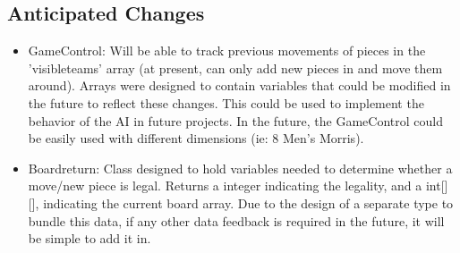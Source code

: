 \documentclass[12pt]{article}
\begin{document}
	\subsection{Anticipated Changes}
	\begin{itemize}
	\item    GameControl: Will be able to track previous movements of pieces in the 'visibleteams' array (at present, can only add new pieces in and move them around). Arrays were designed to contain variables that could be modified in the future to reflect these changes. This could be used to implement the behavior of the AI in future projects. 
	In the future, the GameControl could be easily used with different dimensions (ie: 8 Men's Morris).  
	\item    Boardreturn: Class designed to hold variables needed to determine whether a move/new piece is legal. Returns a integer indicating the legality, and a int[][], indicating the current board array. Due to the design of a separate type to bundle this data, if any other data feedback is required in the future, it will be simple to add it in.
	\end{itemize}
	
\end{document}
